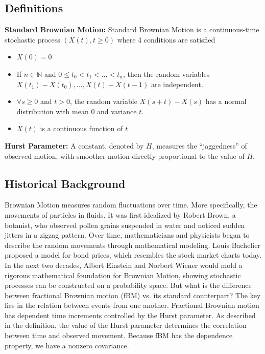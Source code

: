 \documentclass{article}
\begin{document}
\subsection{Definitions}
\textbf{Standard Brownian Motion: } Standard Brownian Motion is a continuous-time stochastic process $(X(t),t\geq 0)$ where 4 conditions are satisfied
\begin{itemize}
    \item $X(0)=0$
    \item If $n\in \mathbb{N}$ and $0\leq t_0<t_1<...<t_n$, then the random variables $X(t_1)-X(t_0),...,X(t)-X(t-1)$ are independent.
    \item $\forall s\geq 0$ and $t > 0$, the random variable $X(s + t)-X(s)$ has a normal distribution with mean 0 and variance $t$.
    \item $X(t)$ is a continuous function of $t$
\end{itemize}
\textbf{Hurst Parameter: }A constant, denoted by $H$, measures the ``jaggedness'' of observed motion, with smoother motion directly proportional to the value of $H$.

\subsection{Historical Background}
Brownian Motion measures random fluctuations over time. More specifically, the movements of particles in fluids. It was first idealized by Robert Brown, a botanist, who observed pollen grains suspended in water and noticed sudden jitters in a zigzag pattern. Over time, mathematicians and physicists began to describe the random movements through mathematical modeling. Louis Bachelier proposed a model for bond prices, which resembles the stock market charts today. In the next two decades, Albert Einstein and Norbert Wiener would mold a rigorous mathematical foundation for Brownian Motion, showing stochastic processes can be constructed on a probability space. But what is the difference between fractional Brownian motion (fBM) vs. its standard counterpart? The key lies in the relation between events from one another. Fractional Brownian motion has dependent time increments controlled by the Hurst parameter. As described in the definition, the value of the Hurst parameter determines the correlation between time and observed movement. Because fBM has the dependence property, we have a nonzero covariance.\\
\\
\end{document}
